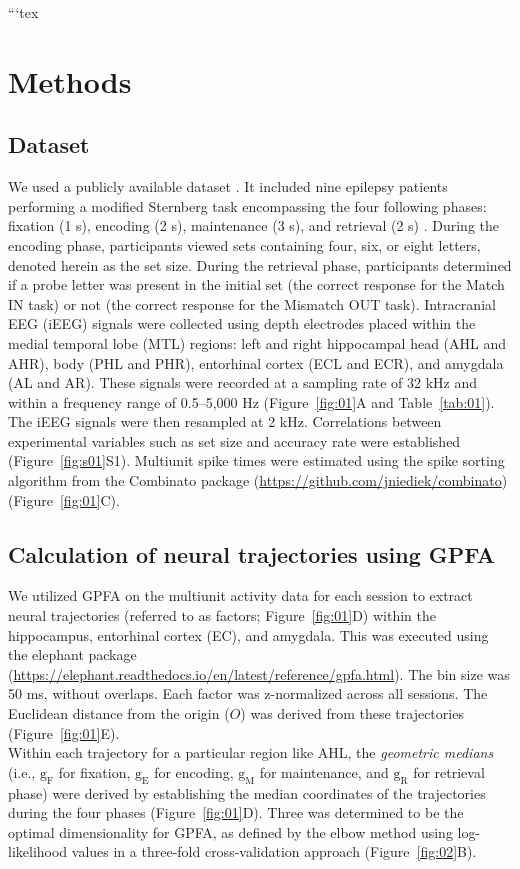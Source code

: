 ```tex
\section{Methods}
\subsection{Dataset}
We used a publicly available dataset \cite{boran_dataset_2020}. It included nine epilepsy patients performing a modified Sternberg task encompassing the four following phases: fixation (1 s), encoding (2 s), maintenance (3 s), and retrieval (2 s) \cite{boran_dataset_2020}. During the encoding phase, participants viewed sets containing four, six, or eight letters, denoted herein as the set size. During the retrieval phase, participants determined if a probe letter was present in the initial set (the correct response for the Match IN task) or not (the correct response for the Mismatch OUT task). Intracranial EEG (iEEG) signals were collected using depth electrodes placed within the medial temporal lobe (MTL) regions: left and right hippocampal head (AHL and AHR), body (PHL and PHR), entorhinal cortex (ECL and ECR), and amygdala (AL and AR). These signals were recorded at a sampling rate of 32 kHz and within a frequency range of 0.5--5,000 Hz (Figure~\ref{fig:01}A and Table~\ref{tab:01}). The iEEG signals were then resampled at 2 kHz. Correlations between experimental variables such as set size and accuracy rate were established (Figure~\ref{fig:s01}S1). Multiunit spike times were estimated using the spike sorting algorithm from the Combinato package \cite{niediek_reliable_2016} (\url{https://github.com/jniediek/combinato})(Figure~\ref{fig:01}C).

\subsection{Calculation of neural trajectories using GPFA}
We utilized GPFA \cite{yu_gaussian-process_2009} on the multiunit activity data for each session to extract neural trajectories (referred to as factors; Figure~\ref{fig:01}D) within the hippocampus, entorhinal cortex (EC), and amygdala. This was executed using the elephant package (\url{https://elephant.readthedocs.io/en/latest/reference/gpfa.html}). The bin size was 50 ms, without overlaps. Each factor was z-normalized across all sessions. The Euclidean distance from the origin ($O$) was derived from these trajectories (Figure~\ref{fig:01}E).
\\
\indent
Within each trajectory for a particular region like AHL, the \textit{geometric medians} (i.e., $\mathrm{g_{F}}$ for fixation, $\mathrm{g_{E}}$ for encoding, $\mathrm{g_{M}}$ for maintenance, and $\mathrm{g_{R}}$ for retrieval phase) were derived by establishing the median coordinates of the trajectories during the four phases (Figure~\ref{fig:01}D). Three was determined to be the optimal dimensionality for GPFA, as defined by the elbow method using log-likelihood values in a three-fold cross-validation approach (Figure~\ref{fig:02}B).

